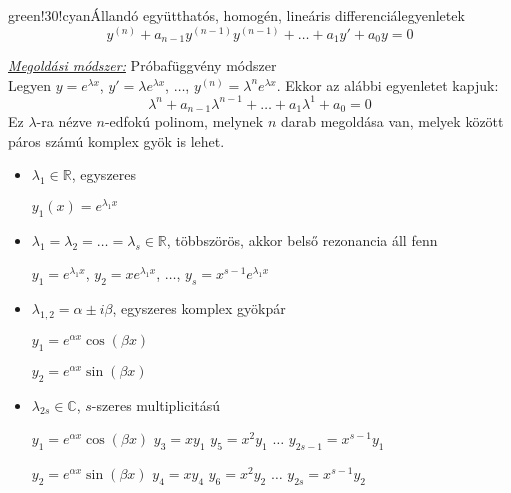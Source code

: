 \documentclass[main.tex]{subfiles}
\begin{document}
\begin{cbox}{green!30!cyan}{Állandó együtthatós, homogén, lineáris differenciálegyenletek}
  \[
    y^{(n)}
    + a_{n-1} y^{(n-1)} y^{(n-1)}
    + \dots
    + a_1 y'
    + a_0 y
    = 0
  \]

  \emph{\underline{Megoldási módszer:}} \quad Próbafüggvény módszer
  \\[2mm]
  Legyen $y = e^{\lambda x}$, $y' = \lambda e^{\lambda x}$,
  $\dots$, $y^{(n)} = \lambda^n e^{\lambda x}$. Ekkor az
  alábbi egyenletet kapjuk:
  \[
    \lambda^n
    + a_{n-1} \lambda^{n-1}
    + \dots
    + a_{1} \lambda^{1}
    + a_{0}
    = 0
  \]
  Ez $\lambda$-ra nézve $n$-edfokú polinom, melynek
  $n$ darab megoldása van, melyek között páros számú
  komplex gyök is lehet.
  \begin{itemize}
    \item $\lambda_1 \in \mathbb{R}$, egyszeres

          $y_1(x) = e^{\lambda_1 x}$

    \item $\lambda_1 = \lambda_2 = \dots = \lambda_s \in \mathbb{R}$,
          többszörös, akkor belső rezonancia áll fenn

          $y_1 = e^{\lambda_1 x}$,
          $y_2 = x e^{\lambda_1 x}$,
          $\dots$,
          $y_s = x^{s-1} e^{\lambda_1 x}$

    \item $\lambda_{1,2} = \alpha \pm i\beta$, egyszeres komplex gyökpár

          $y_1 = e^{\alpha x} \cos (\beta x)$

          $y_2 = e^{\alpha x} \sin (\beta x)$

    \item $\lambda_{2s} \in \mathbb{C}$, $s$-szeres multiplicitású

          $y_1 = e^{\alpha x} \cos (\beta x)$
          \tabto{4cm}
          $y_3 = x y_1$
          \tabto{7cm}
          $y_5 = x^2 y_1$
          \tabto{10cm}
          $\dots$
          \tabto{11.5cm}
          $y_{2s-1} = x^{s-1} y_1$

          $y_2 = e^{\alpha x} \sin (\beta x)$
          \tabto{4cm}
          $y_4 = x y_4$
          \tabto{7cm}
          $y_6 = x^2 y_2$
          \tabto{10cm}
          $\dots$
          \tabto{11.5cm}
          $y_{2s} = x^{s-1} y_2$
  \end{itemize}
\end{cbox}
\end{document}

